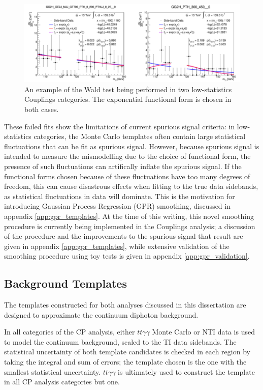 \begin{figure}
\includegraphics[width=\linewidth]{figures/sigbkgparam/Walds.png}
\caption{An example of the Wald test being performed in two low-statistics Couplings categories. The exponential functional form is chosen in both cases.}
\label{fig:WaldTest}
\end{figure} 

These failed fits show the limitations of current spurious signal criteria: in low-statistics categories, the Monte Carlo templates often contain large statistical fluctuations that can be fit as spurious signal. However, because spurious signal is intended to measure the mismodelling due to the choice of functional form, the presence of such fluctuations can artifically inflate the spurious signal. If the functional forms chosen because of these fluctuations have too many degrees of freedom, this can cause disastrous effects when fitting to the true data sidebands, as statistical fluctuations in data will dominate. This is the motivation for introducing Gaussian Process Regression (GPR) smoothing, discussed in appendix \ref{app:gpr_templates}. At the time of this writing, this novel smoothing procedure is currently being implemented in the Couplings analysis; a discussion of the procedure and the improvements to the spurious signal that result are given in appendix \ref{app:gpr_templates}, while extensive validation of the smoothing procedure using toy tests is given in appendix \ref{app:gpr_validation}.

\subsection{Background Templates} \label{sec:bkgtemplates} 

The templates constructed for both analyses discussed in this dissertation are designed to approximate the continuum diphoton background. 

In all categories of the CP analysis, either $tt\gamma\gamma$ Monte Carlo or NTI data is used to model the continuum background, scaled to the TI data sidebands. The statistical uncertainty of both template candidates is checked in each region by taking the integral and sum of errors; the template chosen is the one with the smallest statistical uncertainty. $tt\gamma\gamma$ is ultimately used to construct the template in all CP analysis categories but one. 

